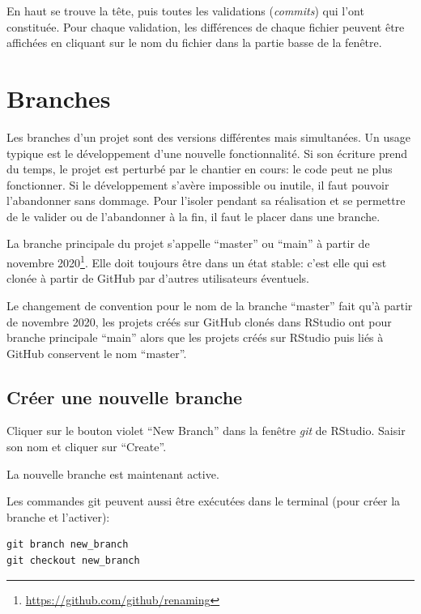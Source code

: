 \documentclass[
  12pt,
  french,
  a4paper,
  extrafontsizes,onecolumn,openright
  ]{memoir}
\begin{document}
En haut se trouve la tête, puis toutes les validations (\emph{commits}) qui l'ont constituée.
Pour chaque validation, les différences de chaque fichier peuvent être affichées en cliquant sur le nom du fichier dans la partie basse de la fenêtre.

\hypertarget{sec:branches}{%
\section{Branches}\label{sec:branches}}

Les branches d'un projet sont des versions différentes mais simultanées.
Un usage typique est le développement d'une nouvelle fonctionnalité.
Si son écriture prend du temps, le projet est perturbé par le chantier en cours: le code peut ne plus fonctionner.
Si le développement s'avère impossible ou inutile, il faut pouvoir l'abandonner sans dommage.
Pour l'isoler pendant sa réalisation et se permettre de le valider ou de l'abandonner à la fin, il faut le placer dans une branche.

La branche principale du projet s'appelle \enquote{master} ou \enquote{main} à partir de novembre 2020\footnote{\url{https://github.com/github/renaming}}.
Elle doit toujours être dans un état stable: c'est elle qui est clonée à partir de GitHub par d'autres utilisateurs éventuels.

Le changement de convention pour le nom de la branche \enquote{master} fait qu'à partir de novembre 2020, les projets créés sur GitHub clonés dans RStudio ont pour branche principale \enquote{main} alors que les projets créés sur RStudio puis liés à GitHub conservent le nom \enquote{master}.

\hypertarget{cruxe9er-une-nouvelle-branche}{%
\subsection{Créer une nouvelle branche}\label{cruxe9er-une-nouvelle-branche}}

Cliquer sur le bouton violet \enquote{New Branch} dans la fenêtre \emph{git} de RStudio.
Saisir son nom et cliquer sur \enquote{Create}.

La nouvelle branche est maintenant active.

Les commandes git peuvent aussi être exécutées dans le terminal (pour créer la branche et l'activer):

\begin{verbatim}
git branch new_branch
git checkout new_branch
\end{verbatim}
\end{document}
